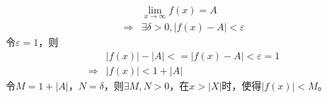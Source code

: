 \documentclass[UTF8]{ctexart}
\begin{document}
\begin{enumerate}
			\begin{equation}
				\begin{split}
					&\lim _{x\rightarrow \infty} f(x)=A \\
					\Rightarrow 
					&\exists \delta>0,|f(x)-A|<\varepsilon
				\end{split}
			\end{equation}
		令$\varepsilon=1$，则
			\begin{equation}
				\begin{split}
					&|f(x)|-|A|<=|f(x)-A|<\varepsilon=1\\
					\Rightarrow
					&|f(x)|<1+|A|
				\end{split}
			\end{equation}
			令$M=1+|A|$，$N=\delta$，则$\exists M,N>0$，在$x>|X|$时，使得$|f(x)|<M$。
		\end{enumerate}
\end{document}
